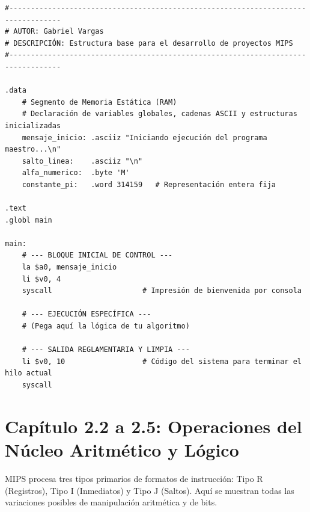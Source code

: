 \documentclass[11pt,letterpaper]{article}
\begin{document}
\begin{lstlisting}[caption={Plantilla estructural limpia para desarrollo en laboratorios.}]
#----------------------------------------------------------------------------------
# AUTOR: Gabriel Vargas
# DESCRIPCIÓN: Estructura base para el desarrollo de proyectos MIPS
#----------------------------------------------------------------------------------

.data
    # Segmento de Memoria Estática (RAM)
    # Declaración de variables globales, cadenas ASCII y estructuras inicializadas
    mensaje_inicio: .asciiz "Iniciando ejecución del programa maestro...\n"
    salto_linea:    .asciiz "\n"
    alfa_numerico:  .byte 'M'
    constante_pi:   .word 314159   # Representación entera fija

.text
.globl main

main:
    # --- BLOQUE INICIAL DE CONTROL ---
    la $a0, mensaje_inicio
    li $v0, 4
    syscall                     # Impresión de bienvenida por consola
    
    # --- EJECUCIÓN ESPECÍFICA ---
    # (Pega aquí la lógica de tu algoritmo)

    # --- SALIDA REGLAMENTARIA Y LIMPIA ---
    li $v0, 10                  # Código del sistema para terminar el hilo actual
    syscall
\end{lstlisting}

\newpage

\section{Capítulo 2.2 a 2.5: Operaciones del Núcleo Aritmético y Lógico}
MIPS procesa tres tipos primarios de formatos de instrucción: Tipo R (Registros), Tipo I (Inmediatos) y Tipo J (Saltos). Aquí se muestran todas las variaciones posibles de manipulación aritmética y de bits.
\end{document}

